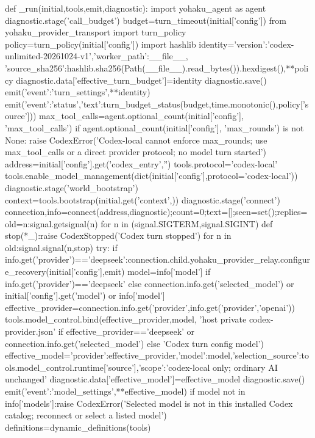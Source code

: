 def _run(initial,tools,emit,diagnostic):
    import yohaku_agent as agent
    diagnostic.stage('call_budget')
    budget=turn_timeout(initial['config'])
    from yohaku_provider_transport import turn_policy
    policy=turn_policy(initial['config'])
    import hashlib
    identity={'version':'codex-unlimited-20261024-v1','worker_path':__file__,
              'source_sha256':hashlib.sha256(Path(__file__).read_bytes()).hexdigest(),**policy}
    diagnostic.data['effective_turn_budget']=identity
    diagnostic.save()
    emit({'event':'turn_settings',**identity})
    emit({'event':'status','text':turn_budget_status(budget,time.monotonic(),policy['source'])})
    max_tool_calls=agent.optional_count(initial['config'], 'max_tool_calls')
    if agent.optional_count(initial['config'], 'max_rounds') is not None:
        raise CodexError('Codex-local cannot enforce max_rounds; use max_tool_calls or a direct provider protocol; no model turn started')
    address=initial['config'].get('codex_entry','')
    tools.protocol='codex-local'
    tools.enable_model_management(dict(initial['config'],protocol='codex-local'))
    diagnostic.stage('world_bootstrap')
    context=tools.bootstrap(initial.get('context',{}))
    diagnostic.stage('connect')
    connection,info=connect(address,diagnostic);count=0;text=[];seen=set();replies={}
    old={n:signal.getsignal(n) for n in (signal.SIGTERM,signal.SIGINT)}
    def stop(*_):raise CodexStopped('Codex turn stopped')
    for n in old:signal.signal(n,stop)
    try:
        if info.get('provider')=='deepseek':connection.child.yohaku_provider_relay.configure_recovery(initial['config'],emit)
        model=info['model'] if info.get('provider')=='deepseek' else connection.info.get('selected_model') or initial['config'].get('model') or info['model']
        effective_provider=connection.info.get('provider',info.get('provider','openai'))
        tools.model_control.bind(effective_provider,model, 'host private codex-provider.json' if effective_provider=='deepseek' or connection.info.get('selected_model') else 'Codex turn config model')
        effective_model={'provider':effective_provider,'model':model,'selection_source':tools.model_control.runtime['source'],'scope':'codex-local only; ordinary AI unchanged'}
        diagnostic.data['effective_model']=effective_model
        diagnostic.save()
        emit({'event':'model_settings',**effective_model})
        if model not in info['models']:raise CodexError('Selected model is not in this installed Codex catalog; reconnect or select a listed model')
        definitions=dynamic_definitions(tools)
